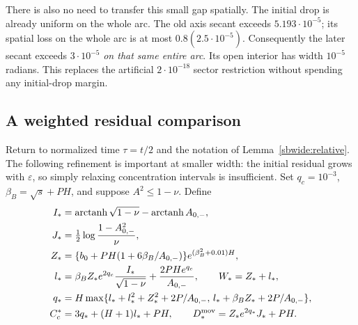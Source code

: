 \documentclass{article} %
\theoremstyle{plain}
\theoremstyle{definition}
\theoremstyle{remark}
\begin{document}
There is also no need to transfer this small gap spatially. The initial
drop is already uniform on the whole arc. The old axis secant exceeds
$5.193\cdot10^{-5}$; its spatial loss on the whole arc is at most
$0.8(2.5\cdot10^{-5})$. Consequently the later secant exceeds
$3\cdot10^{-5}$ \emph{on that same entire arc}. Its open interior has
width $10^{-5}$ radians. This replaces the artificial $2\cdot10^{-18}$
sector restriction without spending any initial-drop margin.

\subsection{A weighted residual comparison}

Return to normalized time $\tau=t/2$ and the notation of
Lemma~\ref{sbwide:relative}. The following refinement is important at
smaller width: the initial residual grows with $\varepsilon$, so simply
relaxing concentration intervals is insufficient.
Set $q_c=10^{-3}$, $\beta_B=\sqrt{s}+PH$, and suppose $A^2\le1-\nu$.
Define
\begin{align*}
 I_*&=\operatorname{arctanh}\sqrt{1-\nu}
                 -\operatorname{arctanh}A_{0,-},\\
 J_*&=\tfrac12\log\frac{1-A_{0,-}^2}{\nu},\\
 Z_*&=\{b_0+PH(1+6\beta_B/A_{0,-})\}
                  e^{(\beta_B^2+0.01)H},\\
 l_*&=\beta_B Z_*e^{2q_c}\frac{I_*}{\sqrt{1-\nu}}
               +\frac{2PH e^{q_c}}{A_{0,-}},\qquad W_*=Z_*+l_*,\\
 q_*&=H\max\{l_*+l_*^2+Z_*^2+2P/A_{0,-},\,
                     l_*+\beta_BZ_*+2P/A_{0,-}\},\\
 C_c^*&=3q_*+(H+1)l_*+PH,\qquad
 D_*^{\rm mov}=Z_*e^{2q_*}J_*+PH.
\end{align*}
\end{document}
